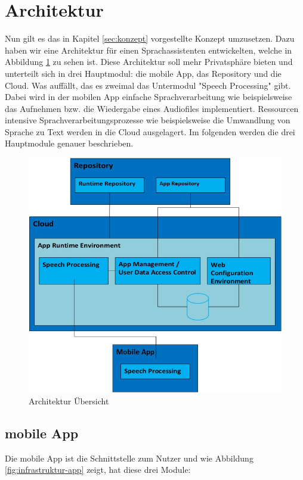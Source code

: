 \section{Architektur}
Nun gilt es das in Kapitel \ref{sec:konzept} vorgestellte Konzept umzusetzen. Dazu haben wir eine Architektur für einen Sprachassistenten entwickelten, welche in Abbildung \ref{fig:infrastruktur-overview} zu sehen ist. Diese Architektur soll mehr Privatsphäre bieten und unterteilt sich in drei Hauptmodul: die mobile App, das Repository und die Cloud. Was auffällt, das es zweimal das Untermodul "Speech Processing" gibt. Dabei wird in der mobilen App einfache Sprachverarbeitung wie beispielsweise das Aufnehmen bzw. die Wiedergabe eines Audiofiles implementiert. Ressourcen intensive Sprachverarbeitungsprozesse wie beispielsweise die Umwandlung von Sprache zu Text werden in die Cloud ausgelagert. Im folgenden werden die drei Hauptmodule genauer beschrieben.
\begin{figure}[h!]
	\centering
	\includegraphics[width=0.9\linewidth]{Picture/Infrastruktur-Overview.jpg}
	\caption[Architektur Übersicht]{Architektur Übersicht}
	\label{fig:infrastruktur-overview}
\end{figure}

\subsection{mobile App}
Die mobile App ist die Schnittstelle zum Nutzer und wie Abbildung \ref{fig:infrastruktur-app} zeigt, hat diese drei Module:

